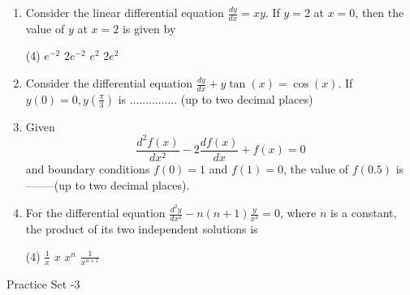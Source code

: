 \begin{enumerate}[label=\color{ocre}\textbf{\arabic*.}]
	{}
	\begin{tasks}(4)
		\task[\textbf{A.}] P, R and S only
		\task[\textbf{B.}]  P and R only
		\task[\textbf{C.}] $\mathrm{Q}$ and $\mathrm{R}$ only
		\task[\textbf{D.}] $\mathrm{R}$ and $\mathrm{S}$ only
	\end{tasks}
	\item Consider the linear differential equation $\frac{d y}{d x}=x y$. If $y=2$ at $x=0$, then the value of $y$ at $x=2$ is given by
	{}
	\begin{tasks}(4)
		\task[\textbf{A.}]  $e^{-2}$
		\task[\textbf{B.}] $2 e^{-2}$
		\task[\textbf{C.}] $e^{2}$
		\task[\textbf{D.}]  $2 e^{2}$
	\end{tasks}
	\item Consider the differential equation $\frac{d y}{d x}+y \tan (x)=\cos (x)$. If $y(0)=0, y\left(\frac{\pi}{3}\right)$ is ............... (up to two decimal places)
	{}
	\item Given
	$$
	\frac{d^{2} f(x)}{d x^{2}}-2 \frac{d f(x)}{d x}+f(x)=0
	$$
	and boundary conditions $f(0)=1$ and $f(1)=0$, the value of $f(0.5)$ is --------(up
	to two decimal places).
	{}
	\item  For the differential equation $\frac{d^{2} y}{d x^{2}}-n(n+1) \frac{y}{x^{2}}=0$, where $n$ is a constant, the product of
	its two independent solutions is
	{}
	\begin{tasks}(4)
		\task[\textbf{A.}] $\frac{1}{x}$
		\task[\textbf{B.}] $x$
		\task[\textbf{C.}] $x^{n}$
		\task[\textbf{D.}] $\frac{1}{x^{n+1}}$
	\end{tasks}
	\end{enumerate}
\newpage 
\begin{abox}
	Practice Set -3
\end{abox}

